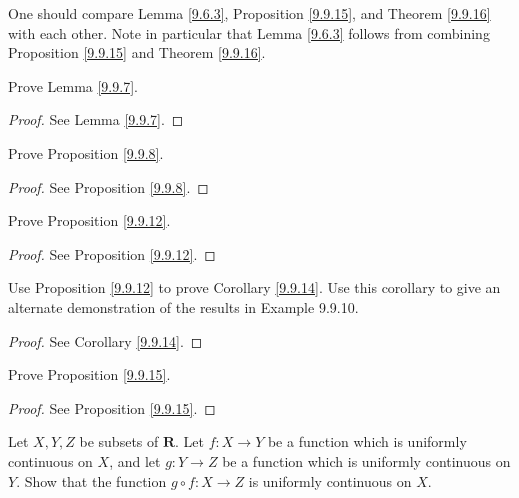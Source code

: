 \begin{remark}\label{9.9.17}
    One should compare Lemma \ref{9.6.3}, Proposition \ref{9.9.15}, and Theorem \ref{9.9.16} with each other.
    Note in particular that Lemma \ref{9.6.3} follows from combining Proposition \ref{9.9.15} and Theorem \ref{9.9.16}.
\end{remark}

\exercisesection

\begin{exercise}\label{ex 9.9.1}
    Prove Lemma \ref{9.9.7}.
\end{exercise}

\begin{proof}
    See Lemma \ref{9.9.7}.
\end{proof}

\begin{exercise}\label{ex 9.9.2}
    Prove Proposition \ref{9.9.8}.
\end{exercise}

\begin{proof}
    See Proposition \ref{9.9.8}.
\end{proof}

\begin{exercise}\label{ex 9.9.3}
    Prove Proposition \ref{9.9.12}.
\end{exercise}

\begin{proof}
    See Proposition \ref{9.9.12}.
\end{proof}

\begin{exercise}\label{ex 9.9.4}
    Use Proposition \ref{9.9.12} to prove Corollary \ref{9.9.14}.
    Use this corollary to give an alternate demonstration of the results in Example 9.9.10.
\end{exercise}

\begin{proof}
    See Corollary \ref{9.9.14}.
\end{proof}

\begin{exercise}\label{ex 9.9.5}
    Prove Proposition \ref{9.9.15}.
\end{exercise}

\begin{proof}
    See Proposition \ref{9.9.15}.
\end{proof}

\begin{exercise}\label{ex 9.9.6}
    Let \(X, Y, Z\) be subsets of \(\mathbf{R}\).
    Let \(f : X \to Y\) be a function which is uniformly continuous on \(X\), and let \(g : Y \to Z\) be a function which is uniformly continuous on \(Y\).
    Show that the function \(g \circ f : X \to Z\) is uniformly continuous on \(X\).
\end{exercise}